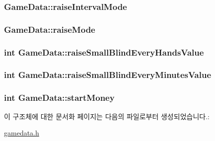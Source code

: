 \hypertarget{struct_game_data_a298a24818a2bf81d8c7565812ff2eb26}{
\subsubsection[{raise\-Interval\-Mode}]{ Game\-Data\-::raise\-Interval\-Mode}}\label{struct_game_data_a298a24818a2bf81d8c7565812ff2eb26}
\hypertarget{struct_game_data_a592278fc8c3d824ddbdc3f8a401320bc}{
\subsubsection[{raise\-Mode}]{ Game\-Data\-::raise\-Mode}}\label{struct_game_data_a592278fc8c3d824ddbdc3f8a401320bc}
\hypertarget{struct_game_data_a943a5365d2a5ac840bb3479c6fe1c23b}{
\subsubsection[{raise\-Small\-Blind\-Every\-Hands\-Value}]{\setlength{\rightskip}{0pt plus 5cm}int Game\-Data\-::raise\-Small\-Blind\-Every\-Hands\-Value}}\label{struct_game_data_a943a5365d2a5ac840bb3479c6fe1c23b}
\hypertarget{struct_game_data_a6601463dbb7b1db927525b24d79e63b8}{
\subsubsection[{raise\-Small\-Blind\-Every\-Minutes\-Value}]{\setlength{\rightskip}{0pt plus 5cm}int Game\-Data\-::raise\-Small\-Blind\-Every\-Minutes\-Value}}\label{struct_game_data_a6601463dbb7b1db927525b24d79e63b8}
\hypertarget{struct_game_data_a1b697f477ae03d3bd3323c4c099d6d58}{
\subsubsection[{start\-Money}]{\setlength{\rightskip}{0pt plus 5cm}int Game\-Data\-::start\-Money}}\label{struct_game_data_a1b697f477ae03d3bd3323c4c099d6d58}


이 구조체에 대한 문서화 페이지는 다음의 파일로부터 생성되었습니다.\-:\begin{DoxyCompactItemize}
\item 
\hyperlink{gamedata_8h}{gamedata.\-h}\end{DoxyCompactItemize}
